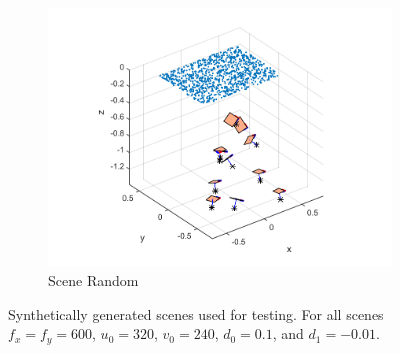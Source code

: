 \documentclass[10pt,twocolumn,letterpaper]{article}
\begin{document}
\begin{figure}
\begin{subfigure}[b]{0.32\linewidth}
\includegraphics[width=\linewidth]{images/synthCameraPosesRandom.pdf}
	\caption{Scene Random}
\end{subfigure}
\caption{Synthetically generated scenes used for testing. For all scenes $f_x=f_y=600$, $u_0=320$, $v_0=240$, $d_0=0.1$, and $d_1=-0.01$.}
\label{fig:synth_poses}
\end{figure}
\end{document}
